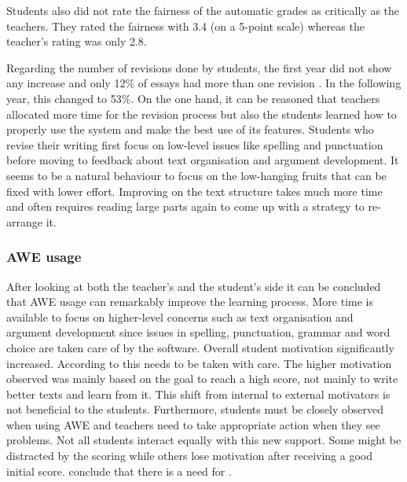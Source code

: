 \documentclass[runningheads]{llncs}
\begin{document}
Students also did not rate the fairness of the automatic grades as critically as the teachers. They rated the fairness with 3.4 (on a 5-point scale) whereas the teacher's rating was only 2.8.

Regarding the number of revisions done by students, the first year did not show any increase and only 12\% of essays had more than one revision \citep{grimes_utility_2010}. In the following year, this changed to 53\%. On the one hand, it can be reasoned that teachers allocated more time for the revision process but also the students learned how to properly use the system and make the best use of its features. Students who revise their writing first focus on low-level issues like spelling and punctuation before moving to feedback about text organisation and argument development. It seems to be a natural behaviour to focus on the low-hanging fruits that can be fixed with lower effort. Improving on the text structure takes much more time and often requires reading large parts again to come up with a strategy to re-arrange it.

\subsubsection{AWE usage} After looking at both the teacher's and the student's side it can be concluded that AWE usage can remarkably improve the learning process. More time is available to focus on higher-level concerns such as text organisation and argument development since issues in spelling, punctuation, grammar and word choice are taken care of by the software. Overall student motivation significantly increased. According to \textcite{grimes_utility_2010} this needs to be taken with care. The higher motivation observed was mainly based on the goal to reach a high score, not mainly to write better texts and learn from it. This shift from internal to external motivators is not beneficial to the students. Furthermore, students must be closely observed when using AWE and teachers need to take appropriate action when they see problems. Not all students interact equally with this new support. Some might be distracted by the scoring while others lose motivation after receiving a good initial score. \citeauthor{grimes_utility_2010} conclude that there is a need for .
\end{document}
